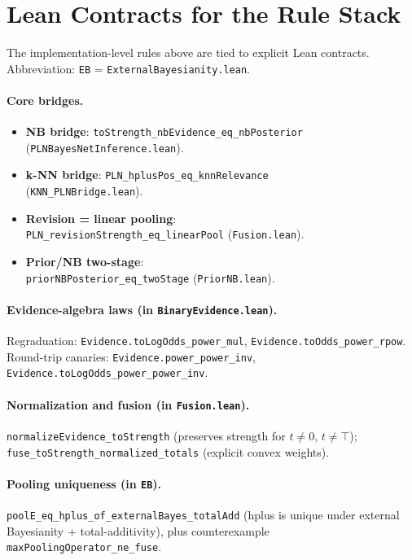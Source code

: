 \documentclass[11pt]{article}
\newcommand{\lpath}[1]{\texttt{\nolinkurl{#1}}}
\newcommand{\lid}[1]{{\ttfamily\nolinkurl{#1}}}
\begin{document}
\section{Lean Contracts for the Rule Stack}
The implementation-level rules above are tied to explicit Lean contracts.
Abbreviation: \texttt{EB} = \lpath{ExternalBayesianity.lean}.

\paragraph{Core bridges.}
\begin{itemize}
\item \textbf{NB bridge}: \lid{toStrength_nbEvidence_eq_nbPosterior}\\
      (\lpath{PLNBayesNetInference.lean}).
\item \textbf{k-NN bridge}: \lid{PLN_hplusPos_eq_knnRelevance}\\
      (\lpath{KNN_PLNBridge.lean}).
\item \textbf{Revision = linear pooling}:\\
      \lid{PLN_revisionStrength_eq_linearPool}
      (\lpath{Fusion.lean}).
\item \textbf{Prior/NB two-stage}:\\
      \lid{priorNBPosterior_eq_twoStage}
      (\lpath{PriorNB.lean}).
\end{itemize}

\paragraph{Evidence-algebra laws (in \lpath{BinaryEvidence.lean}).}
Regraduation: \lid{Evidence.toLogOdds_power_mul},
\lid{Evidence.toOdds_power_rpow}.
Round-trip canaries: \lid{Evidence.power_power_inv},
\lid{Evidence.toLogOdds_power_power_inv}.

\paragraph{Normalization and fusion (in \lpath{Fusion.lean}).}
\lid{normalizeEvidence_toStrength} (preserves strength for $t\neq 0$, $t\neq\top$);
\lid{fuse_toStrength_normalized_totals} (explicit convex weights).

\paragraph{Pooling uniqueness (in \texttt{EB}).}
\lid{poolE_eq_hplus_of_externalBayes_totalAdd} (hplus is unique under
external Bayesianity + total-additivity),
plus counterexample \lid{maxPoolingOperator_ne_fuse}.
\end{document}
